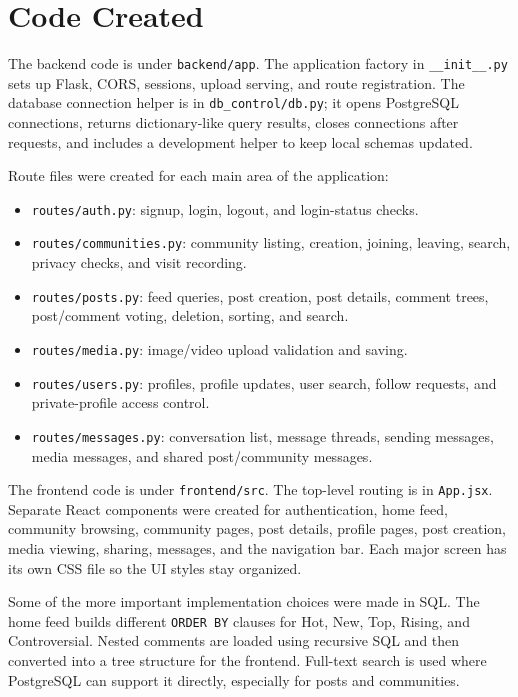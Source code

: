 \documentclass[11pt]{article}
\begin{document}
\section{Code Created}

The backend code is under \texttt{backend/app}. The application factory in \texttt{\_\_init\_\_.py} sets up Flask, CORS, sessions, upload serving, and route registration. The database connection helper is in \texttt{db\_control/db.py}; it opens PostgreSQL connections, returns dictionary-like query results, closes connections after requests, and includes a development helper to keep local schemas updated.

Route files were created for each main area of the application:

\begin{itemize}
    \item \texttt{routes/auth.py}: signup, login, logout, and login-status checks.
    \item \texttt{routes/communities.py}: community listing, creation, joining, leaving, search, privacy checks, and visit recording.
    \item \texttt{routes/posts.py}: feed queries, post creation, post details, comment trees, post/comment voting, deletion, sorting, and search.
    \item \texttt{routes/media.py}: image/video upload validation and saving.
    \item \texttt{routes/users.py}: profiles, profile updates, user search, follow requests, and private-profile access control.
    \item \texttt{routes/messages.py}: conversation list, message threads, sending messages, media messages, and shared post/community messages.
\end{itemize}

The frontend code is under \texttt{frontend/src}. The top-level routing is in \texttt{App.jsx}. Separate React components were created for authentication, home feed, community browsing, community pages, post details, profile pages, post creation, media viewing, sharing, messages, and the navigation bar. Each major screen has its own CSS file so the UI styles stay organized.

Some of the more important implementation choices were made in SQL. The home feed builds different \texttt{ORDER BY} clauses for Hot, New, Top, Rising, and Controversial. Nested comments are loaded using recursive SQL and then converted into a tree structure for the frontend. Full-text search is used where PostgreSQL can support it directly, especially for posts and communities.
\end{document}
